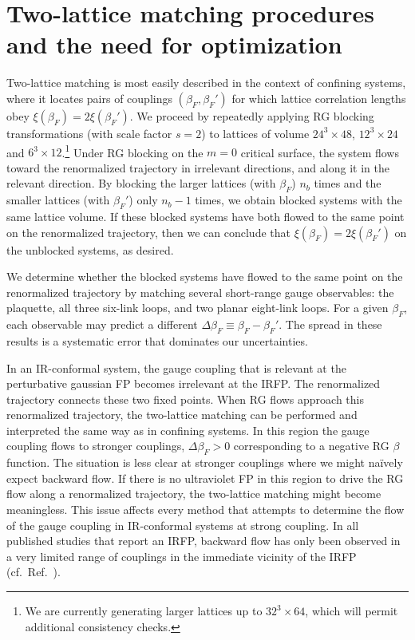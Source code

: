 \documentclass{PoS}
\newcommand{\be}{\ensuremath{\beta} }
\newcommand{\De}{\ensuremath{\Delta} }
\newcommand{\X}{\ensuremath{\!\times\!} }
\newcommand{\refcite}[1]{Ref.~\cite{#1}}
\begin{document}
\section{Two-lattice matching procedures and the need for optimization} %
Two-lattice matching is most easily described in the context of confining systems, where it locates pairs of couplings $(\be_F, \be_F')$ for which lattice correlation lengths obey $\xi(\be_F) = 2\xi(\be_F')$.
We proceed by repeatedly applying RG blocking transformations (with scale factor $s = 2$) to lattices of volume $24^3\X48$, $12^3\X24$ and $6^3\X12$.\footnote{We are currently generating larger lattices up to $32^3\X64$, which will permit additional consistency checks.}
Under RG blocking on the $m = 0$ critical surface, the system flows toward the renormalized trajectory in irrelevant directions, and along it in the relevant direction.
By blocking the larger lattices (with $\be_F$) $n_b$ times and the smaller lattices (with $\be_F'$) only $n_b - 1$ times, we obtain blocked systems with the same lattice volume.
If these blocked systems have both flowed to the same point on the renormalized trajectory, then we can conclude that $\xi(\be_F) = 2\xi(\be_F')$ on the unblocked systems, as desired.

We determine whether the blocked systems have flowed to the same point on the renormalized trajectory by matching several short-range gauge observables: the plaquette, all three six-link loops, and two planar eight-link loops.
For a given $\be_F$, each observable may predict a different $\De\be_F \equiv \be_F - \be_F'$.
The spread in these results is a systematic error that dominates our uncertainties.

In an IR-conformal system, the gauge coupling that is relevant at the perturbative gaussian FP becomes irrelevant at the IRFP.
The renormalized trajectory connects these two fixed points.
When RG flows approach this renormalized trajectory, the two-lattice matching can be performed and interpreted the same way as in confining systems.
In this region the gauge coupling flows to stronger couplings, $\De\be_F > 0$ corresponding to a negative RG \be function.
The situation is less clear at stronger couplings where we might na\"ively expect backward flow.
If there is no ultraviolet FP in this region to drive the RG flow along a renormalized trajectory, the two-lattice matching might become meaningless.
This issue affects every method that attempts to determine the flow of the gauge coupling in IR-conformal systems at strong coupling.
In all published studies that report an IRFP, backward flow has only been observed in a very limited range of couplings in the immediate vicinity of the IRFP (cf.~\refcite{Giedt:2012LAT}).
\end{document}
